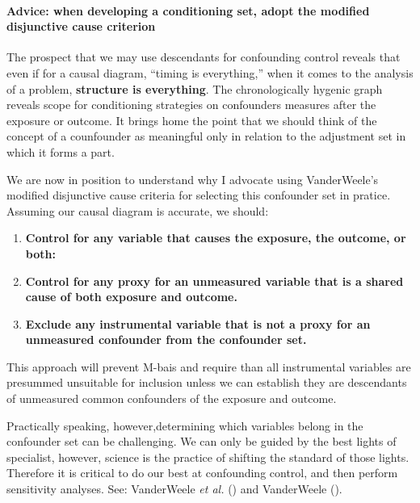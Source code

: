\documentclass[
  singlecolumn,
  9pt]{article}
\let\oldparagraph\paragraph
\renewcommand{\paragraph}[1]{\oldparagraph{#1}\mbox{}}
\providecommand{\tightlist}{%
  \setlength{\itemsep}{0pt}\setlength{\parskip}{0pt}}\usepackage{longtable,booktabs,array}
\begin{document}
\paragraph{Advice: when developing a conditioning set, adopt the
modified disjunctive cause
criterion}\label{advice-when-developing-a-conditioning-set-adopt-the-modified-disjunctive-cause-criterion}

The prospect that we may use descendants for confounding control reveals
that even if for a causal diagram, ``timing is everything,'' when it
comes to the analysis of a problem, \textbf{structure is everything}.
The chronologically hygenic graph reveals scope for conditioning
strategies on confounders measures after the exposure or outcome. It
brings home the point that we should think of the concept of a
counfounder as meaningful only in relation to the adjustment set in
which it forms a part.

We are now in position to understand why I advocate using VanderWeele's
modified disjunctive cause criteria for selecting this confounder set in
pratice. Assuming our causal diagram is accurate, we should:

\begin{enumerate}
\def\labelenumi{\alph{enumi}.}
\tightlist
\item
  \textbf{Control for any variable that causes the exposure, the
  outcome, or both:}
\item
  \textbf{Control for any proxy for an unmeasured variable that is a
  shared cause of both exposure and outcome.}
\item
  \textbf{Exclude any instrumental variable that is not a proxy for an
  unmeasured confounder from the confounder set.}
\end{enumerate}

This approach will prevent M-bais and require than all instrumental
variables are presummed unsuitable for inclusion unless we can establish
they are descendants of unmeasured common confounders of the exposure
and outcome.

Practically speaking, however,determining which variables belong in the
confounder set can be challenging. We can only be guided by the best
lights of specialist, however, science is the practice of shifting the
standard of those lights. Therefore it is critical to do our best at
confounding control, and then perform sensitivity analyses. See:
VanderWeele \emph{et al.} () and
VanderWeele ().
\end{document}
